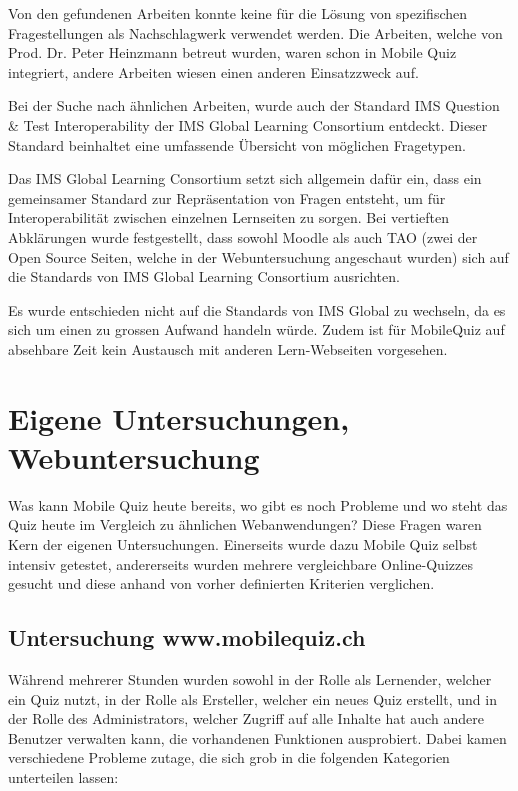 Von den gefundenen Arbeiten konnte keine für die Lösung von spezifischen Fragestellungen als Nachschlagwerk verwendet werden. Die Arbeiten, welche von Prod. Dr. Peter Heinzmann betreut wurden, waren schon in Mobile Quiz integriert, andere Arbeiten wiesen einen anderen Einsatzzweck auf.

Bei der Suche nach ähnlichen Arbeiten, wurde auch der Standard \glqq IMS Question \& Test Interoperability\grqq \cite{imsglobal.org} der IMS Global Learning Consortium entdeckt. Dieser Standard beinhaltet eine umfassende Übersicht von möglichen Fragetypen.

Das IMS Global Learning Consortium setzt sich allgemein dafür ein, dass ein gemeinsamer Standard zur Repräsentation von Fragen entsteht, um für Interoperabilität zwischen einzelnen Lernseiten zu sorgen. Bei vertieften Abklärungen wurde festgestellt, dass sowohl Moodle \cite{moodle} als auch TAO \cite{tao} (zwei der Open Source Seiten, welche in der Webuntersuchung angeschaut wurden) sich auf die Standards von IMS Global Learning Consortium ausrichten.

Es wurde entschieden nicht auf die Standards von IMS Global zu wechseln, da es sich um einen zu grossen Aufwand handeln würde. Zudem ist für MobileQuiz auf absehbare Zeit kein Austausch mit anderen Lern-Webseiten vorgesehen.


\section{Eigene Untersuchungen, Webuntersuchung}
\label{sec:eigeneUntersuchungenWebuntersuchungen}

Was kann Mobile Quiz heute bereits, wo gibt es noch Probleme und wo steht das Quiz heute im Vergleich zu ähnlichen Webanwendungen? Diese Fragen waren Kern der eigenen Untersuchungen. Einerseits wurde dazu Mobile Quiz selbst intensiv getestet, andererseits wurden mehrere vergleichbare Online-Quizzes gesucht und diese anhand von vorher definierten Kriterien verglichen.


	\subsection{Untersuchung www.mobilequiz.ch}
	\label{subsec:eigeneUntersuchungen}
	Während mehrerer Stunden wurden sowohl in der Rolle als Lernender, welcher ein Quiz nutzt, in der Rolle als Ersteller, welcher ein neues Quiz erstellt, und in der Rolle des Administrators, welcher Zugriff auf alle Inhalte hat auch andere Benutzer verwalten kann, die vorhandenen Funktionen ausprobiert. Dabei kamen verschiedene Probleme zutage, die sich grob in die folgenden Kategorien unterteilen lassen:
	
